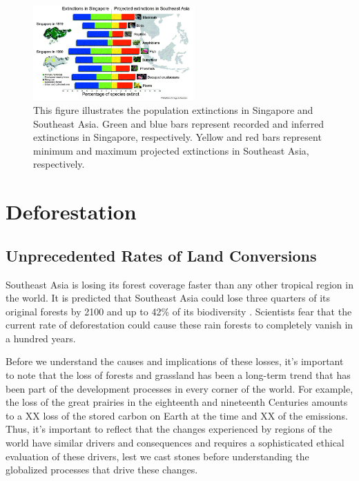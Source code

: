  \begin{figure}[ht]
    \centering
        \includegraphics[width = 0.55\textwidth]{graphics/extinction.jpg}
        \caption{This figure illustrates the population extinctions in Singapore and Southeast Asia. Green and blue bars represent recorded and inferred extinctions in Singapore, respectively. Yellow and red bars represent minimum and maximum projected extinctions in Southeast Asia, respectively. \citep{sodhi2004southeast}}
    \end{figure}


 

\section{Deforestation}

\subsection{Unprecedented Rates of Land Conversions}

Southeast Asia is losing its forest coverage faster than any other tropical region in the world. It is predicted that Southeast Asia could lose three quarters of its original forests by 2100 and up to 42\% of its biodiversity \citep{sodhi2004southeast}. Scientists fear that the current rate of deforestation could cause these rain forests to completely vanish in a hundred years. 

Before we understand the causes and implications of these losses, it's important to note that the loss of forests and grassland has been a long-term trend that has been part of the development processes in every corner of the world. For example, the loss of the great prairies in the eighteenth and nineteenth Centuries amounts to a XX loss of the stored carbon on Earth at the time and XX of the  emissions. Thus, it's important to reflect that the changes experienced by regions of the world have similar drivers and consequences and requires a sophisticated ethical evaluation of these drivers, lest we cast stones before understanding the globalized processes that drive these changes. 

